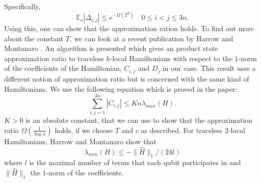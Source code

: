 Specifically, \[
	\mathbb{E}_r\left| \Delta_{i,j} \right|  \le e^{-\Omega(T^2)} \quad 0\le i<j\le 3n
.\]
Using this, one can show that the approximation ration holds.
To find out more about the constant $T$, we can look at a recent publication by Harrow and Montanaro \cite{harrow17}.
An algorithm is presented which gives an product state approximation ratio to traceless $k$-local Hamiltonians with respect to the $1$-norm of the coefficients of the Hamiltonian, $C_{i,j}$ and $D_j$ in our case.
This result uses a different notion of approximation ratio but is concerned with the same kind of Hamiltonians.
We use the following equation which is proved in the paper: \[
	\sum_{i,j=1}^{3n} \left| C_{i,j} \right| \le Kn\lambda_{max}(H)
.\]
$K>0$ is an absolute constant, that we can use to show that the approximation ratio $\Omega(\frac{1}{\log{}n})$ holds, if we choose $T$ and $c$ as described.
For traceless $2$-local Hamiltonians, Harrow and Montanaro show that \[
	\lambda_{min}(H)\le - \|\hat{H}\|_1/(24l)
\]
where $l$ is the maximal number of terms that each qubit participates in and $\|\hat{H}\|_1$ the $1$-norm of the coefficients.
